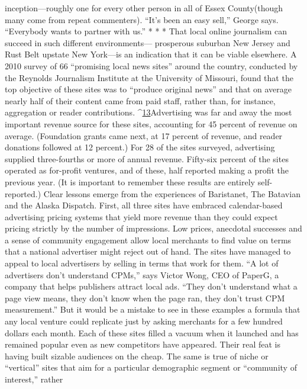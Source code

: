 inception—roughly one for every other person in all of Essex County(though
many come from repeat commenters). ``It’s been an easy sell,'' George says. ``Everybody
wants to partner with us.''
* * *
That local online journalism can succeed in such different environments—
prosperous suburban New Jersey and Rust Belt upstate New York—is an indication
that it can be viable elsewhere. A 2010 survey of 66 ``promising local news
sites'' around the country, conducted by the Reynolds Journalism Institute at the
University of Missouri, found that the top objective of these sites was to ``produce
original news'' and that on average nearly half of their content came from
paid staff, rather than, for instance, aggregation or reader contributions. ^{\href{#endnotes-ch3}{13}}Advertising was far and away the most important revenue source for these sites,
accounting for 45 percent of revenue on average. (Foundation grants came next,
at 17 percent of revenue, and reader donations followed at 12 percent.) For 28 of
the sites surveyed, advertising supplied three-fourths or more of annual revenue.
Fifty-six percent of the sites operated as for-profit ventures, and of these, half
reported making a profit the previous year. (It is important to remember these
results are entirely self-reported.)
Clear lessons emerge from the experiences of Baristanet, The Batavian and the
Alaska Dispatch. First, all three sites have embraced calendar-based advertising
pricing systems that yield more revenue than they could expect pricing strictly
by the number of impressions. Low prices, anecdotal successes and a sense of
community engagement allow local merchants to find value on terms that a
national advertiser might reject out of hand. The sites have managed to appeal to
local advertisers by selling in terms that work for them. ``A lot of advertisers don’t
understand CPMs,'' says Victor Wong, CEO of PaperG, a company that helps
publishers attract local ads. ``They don’t understand what a page view means, they
don’t know when the page ran, they don’t trust CPM measurement.''
But it would be a mistake to see in these examples a formula that any local
venture could replicate just by asking merchants for a few hundred dollars each
month. Each of these sites filled a vacuum when it launched and has remained
popular even as new competitors have appeared. Their real feat is having built
sizable audiences on the cheap. The same is true of niche or ``vertical'' sites that
aim for a particular demographic segment or ``community of interest,'' rather
